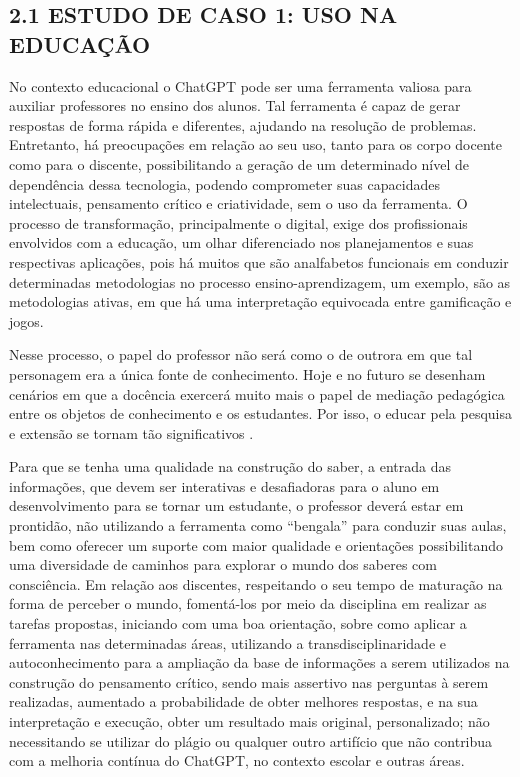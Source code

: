 \subsection*{{2.1 ESTUDO DE CASO 1: USO NA EDUCAÇÃO}}
No contexto educacional o ChatGPT pode ser uma ferramenta valiosa para auxiliar professores no ensino dos alunos. Tal ferramenta é capaz de gerar respostas de forma rápida e diferentes, ajudando na resolução de problemas. Entretanto, há preocupações em relação ao seu uso, tanto para os corpo docente como para o discente, possibilitando a geração de um determinado nível de dependência dessa tecnologia, podendo comprometer suas capacidades intelectuais, pensamento crítico e criatividade, sem o uso da ferramenta. O processo de transformação, principalmente o digital, exige dos profissionais envolvidos com a educação, um olhar diferenciado nos planejamentos e suas respectivas aplicações, pois há muitos que são analfabetos funcionais em conduzir determinadas metodologias no processo ensino-aprendizagem, um exemplo, são as metodologias ativas, em que há uma interpretação equivocada entre gamificação e jogos. 

Nesse processo, o papel do professor não será como o de outrora em que tal personagem era a única fonte de conhecimento. Hoje e no futuro se desenham cenários em que a docência exercerá muito mais o papel de mediação pedagógica entre os objetos de conhecimento e os estudantes. Por isso, o educar pela pesquisa e extensão se tornam tão significativos \cite{cassol2023}.

Para que se tenha uma qualidade na construção do saber, a entrada das informações, que devem ser interativas e desafiadoras para o aluno em  desenvolvimento para se tornar um estudante, o professor deverá estar em prontidão, não utilizando a ferramenta como “bengala” para conduzir suas aulas, bem como oferecer um suporte com maior qualidade e orientações possibilitando uma diversidade de caminhos para explorar o mundo dos saberes com consciência. Em relação aos discentes, respeitando o seu tempo de maturação na forma de perceber o mundo, fomentá-los por meio da disciplina em realizar as tarefas propostas, iniciando com uma boa orientação, sobre como aplicar a ferramenta nas determinadas áreas, utilizando a transdisciplinaridade e autoconhecimento para a ampliação da base de informações a serem utilizados na construção do pensamento crítico, sendo mais assertivo nas perguntas à serem realizadas, aumentado a probabilidade de obter melhores respostas, e na sua interpretação e execução, obter um resultado mais original, personalizado; não necessitando se utilizar do plágio ou qualquer outro artifício que não contribua com a melhoria contínua do ChatGPT, no contexto escolar e outras áreas. 


